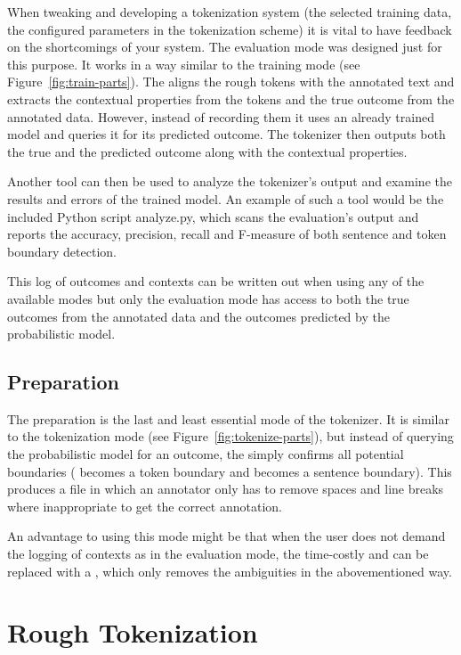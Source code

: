 When tweaking and developing a tokenization system (the selected training data,
the configured parameters in the tokenization scheme) it is vital to have
feedback on the shortcomings of your system. The evaluation mode was designed
just for this purpose. It works in a way similar to the training mode (see
Figure~\ref{fig:train-parts}). The  aligns the rough tokens
with the annotated text and extracts the contextual properties from the tokens
and the true outcome from the annotated data. However, instead of recording
them it uses an already trained model and queries it for its predicted outcome.
The tokenizer then outputs both the true and the predicted outcome along with
the contextual properties.

Another tool can then be used to analyze the tokenizer's output and examine the
results and errors of the trained model. An example of such a tool would be the
included Python script analyze.py, which scans the evaluation's output and
reports the accuracy, precision, recall and F-measure of both sentence and
token boundary detection.

This log of outcomes and contexts can be written out when using any of the
available modes but only the evaluation mode has access to both the true
outcomes from the annotated data and the outcomes predicted by the
probabilistic model.

\subsection{Preparation}
\label{ssec:impl-modes-prepare}

The preparation is the last and least essential mode of the tokenizer. It is
similar to the tokenization mode (see Figure~\ref{fig:tokenize-parts}), but
instead of querying the probabilistic model for an outcome, the
 simply confirms all potential boundaries (\maysplit{}
becomes a token boundary and \maybreaksentence{} becomes a sentence boundary).
This produces a file in which an annotator only has to remove spaces and line
breaks where inappropriate to get the correct annotation.

An advantage to using this mode might be that when the user does not demand the
logging of contexts as in the evaluation mode, the time-costly
 and  can be replaced with a
, which only removes the ambiguities in the
abovementioned way.

\section{Rough Tokenization}
\label{sec:impl-roughtok}

